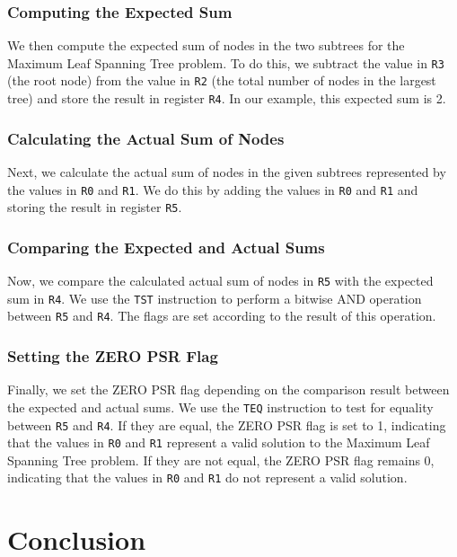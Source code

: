 \subsubsection{Computing the Expected Sum}

We then compute the expected sum of nodes in the two subtrees for the Maximum Leaf Spanning Tree problem. To do this, we subtract the value in \texttt{R3} (the root node) from the value in \texttt{R2} (the total number of nodes in the largest tree) and store the result in register \texttt{R4}. In our example, this expected sum is 2.

\subsubsection{Calculating the Actual Sum of Nodes}

Next, we calculate the actual sum of nodes in the given subtrees represented by the values in \texttt{R0} and \texttt{R1}. We do this by adding the values in \texttt{R0} and \texttt{R1} and storing the result in register \texttt{R5}.

\subsubsection{Comparing the Expected and Actual Sums}

Now, we compare the calculated actual sum of nodes in \texttt{R5} with the expected sum in \texttt{R4}. We use the \texttt{TST} instruction to perform a bitwise AND operation between \texttt{R5} and \texttt{R4}. The flags are set according to the result of this operation.

\subsubsection{Setting the ZERO PSR Flag}

Finally, we set the ZERO PSR flag depending on the comparison result between the expected and actual sums. We use the \texttt{TEQ} instruction to test for equality between \texttt{R5} and \texttt{R4}. If they are equal, the ZERO PSR flag is set to 1, indicating that the values in \texttt{R0} and \texttt{R1} represent a valid solution to the Maximum Leaf Spanning Tree problem. If they are not equal, the ZERO PSR flag remains 0, indicating that the values in \texttt{R0} and \texttt{R1} do not represent a valid solution.

\section{Conclusion}

